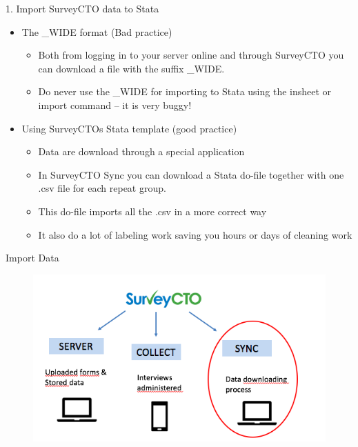 \documentclass[aspectratio=169]{beamer}
\begin{document}
\begin{frame}{1. Import SurveyCTO data to Stata}
\begin{itemize}
	\item The \_WIDE format (Bad practice)
		\begin{itemize}
			\item Both from logging in to your server online and through SurveyCTO you can download a file with the suffix \_WIDE.
			\item Do never use the \_WIDE for importing to Stata using the insheet or import command – it is very buggy!		
		\end{itemize}
	\item Using SurveyCTOs Stata template (good practice)
		\begin{itemize}
			\item Data are download through a special application 
			\item In SurveyCTO Sync you can download a Stata do-file together with one .csv file for each repeat group.
			\item This do-file imports all the .csv in a more correct way
			\item It also do a lot of labeling work saving you hours or days of cleaning work
		\end{itemize}
	\end{itemize}
\end{frame}


\begin{frame}{Import Data}
		\begin{figure}
		\centering
		\includegraphics[width=\linewidth]{img/importscto}
	\end{figure}
\end{frame}
\end{document}
